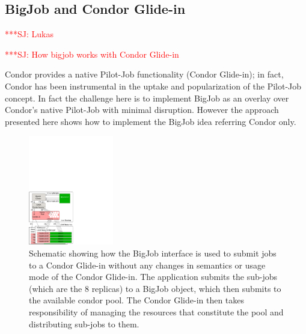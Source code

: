 \documentclass[conference,final]{IEEEtran}
\newcommand{\up}{\vspace*{-1em}}
\newcommand{\alnote}[1]{ {\textcolor{blue} { ***AL: #1 }}}
\newcommand{\jhanote}[1]{ {\textcolor{red} { ***SJ: #1 }}}
\newcommand{\alnote}[1]{}
\newcommand{\jhanote}[1]{}
\begin{document}


\subsection{BigJob and Condor Glide-in} \jhanote{Lukas}
\up

\jhanote{How bigjob works with Condor Glide-in}


Condor provides a native Pilot-Job functionality (Condor Glide-in); in
fact, Condor has been instrumental in the uptake and popularization of
the Pilot-Job concept.  In fact the challenge here is to implement
BigJob as an overlay over Condor's native Pilot-Job with minimal
disruption. However the approach presented here shows how to
implement the BigJob idea referring Condor only.

\begin{figure}[!ht]
 \begin{center}
     \includegraphics[width=0.33\textwidth]{figures/bigjob_condor}
 \end{center}
 \caption{\small Schematic showing how the BigJob interface is used to
   submit jobs to a Condor Glide-in without any changes in semantics
   or usage mode of the Condor Glide-in. The application submits the
   sub-jobs (which are the 8 replicas) to a BigJob object, which then
   submits to the available condor pool. The Condor Glide-in then
   takes responsibility of managing the resources that constitute the
   pool and distributing sub-jobs to them.} \label{fig:saga-condor}
\end{figure}
\end{document}
